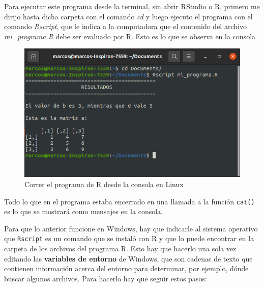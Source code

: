 \documentclass[
]{book}
\begin{document}
Para ejecutar este programa desde la terminal, sin abrir RStudio o R, primero me dirijo hasta dicha carpeta con el comando \emph{cd} y luego ejecuto el programa con el comando \emph{Rscript}, que le indica a la computadora que el contenido del archivo \emph{mi\_programa.R} debe ser evaluado por R. Esto es lo que se observa en la consola

\begin{figure}

{\centering \includegraphics[width=0.8\linewidth]{images/07_otros/consola} 

}

\caption{Correr el programa de R desde la consola en Linux}\label{fig:unnamed-chunk-160}
\end{figure}

Todo lo que en el programa estaba encerrado en una llamada a la función \texttt{cat()} es lo que se mostrará como mensajes en la consola.

Para que lo anterior funcione en Windows, hay que indicarle al sistema operativo que \texttt{Rscript} es un comando que se instaló con R y que lo puede encontrar en la carpeta de los archivos del programa R. Esto hay que hacerlo una sola vez editando las \textbf{variables de entorno} de Windows, que son cadenas de texto que contienen información acerca del entorno para determinar, por ejemplo, dónde buscar algunos archivos. Para hacerlo hay que seguir estos pasos:
\end{document}
